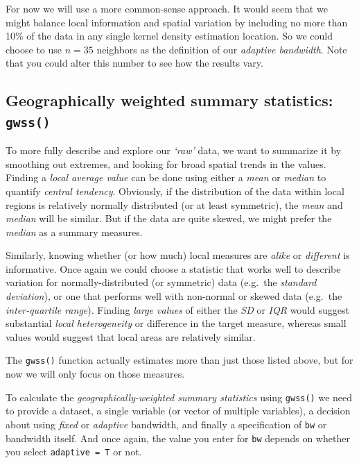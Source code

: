 \documentclass[
]{book}
\newcommand{\passthrough}[1]{#1}
\begin{document}
For now we will use a more common-sense approach. It would seem that we might balance local information and spatial variation by including no more than 10\% of the data in any single kernel density estimation location. So we could choose to use \(n=35\) neighbors as the definition of our \emph{adaptive bandwidth}. Note that you could alter this number to see how the results vary.

\hypertarget{geographically-weighted-summary-statistics-gwss}{%
\subsection{\texorpdfstring{Geographically weighted summary statistics: \texttt{gwss()}}{Geographically weighted summary statistics: gwss()}}\label{geographically-weighted-summary-statistics-gwss}}

To more fully describe and explore our \emph{`raw'} data, we want to summarize it by smoothing out extremes, and looking for broad spatial trends in the values. Finding a \emph{local average value} can be done using either a \emph{mean} or \emph{median} to quantify \emph{central tendency}. Obviously, if the distribution of the data within local regions is relatively normally distributed (or at least symmetric), the \emph{mean} and \emph{median} will be similar. But if the data are quite skewed, we might prefer the \emph{median} as a summary measures.

Similarly, knowing whether (or how much) local measures are \emph{alike} or \emph{different} is informative. Once again we could choose a statistic that works well to describe variation for normally-distributed (or symmetric) data (e.g.~the \emph{standard deviation}), or one that performs well with non-normal or skewed data (e.g.~the \emph{inter-quartile range}). Finding \emph{large values} of either the \emph{SD} or \emph{IQR} would suggest substantial \emph{local heterogeneity} or difference in the target measure, whereas small values would suggest that local areas are relatively similar.

The \passthrough{\lstinline!gwss()!} function actually estimates more than just those listed above, but for now we will only focus on those measures.

To calculate the \emph{geographically-weighted summary statistics} using \passthrough{\lstinline!gwss()!} we need to provide a dataset, a single variable (or vector of multiple variables), a decision about using \emph{fixed} or \emph{adaptive} bandwidth, and finally a specification of \passthrough{\lstinline!bw!} or bandwidth itself. And once again, the value you enter for \passthrough{\lstinline!bw!} depends on whether you select \passthrough{\lstinline!adaptive = T!} or not.
\end{document}
